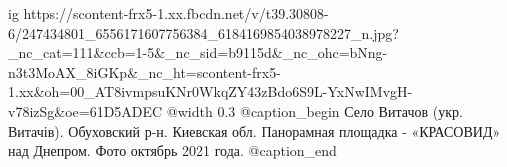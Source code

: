 
 
 
 
 

\ifcmt
  ig https://scontent-frx5-1.xx.fbcdn.net/v/t39.30808-6/247434801_6556171607756384_6184169854038978227_n.jpg?_nc_cat=111&ccb=1-5&_nc_sid=b9115d&_nc_ohc=bNng-n3t3MoAX_8iGKp&_nc_ht=scontent-frx5-1.xx&oh=00_AT8ivmpsuKNr0WkqZY43zBdo6S9L-YxNwIMvgH-v78izSg&oe=61D5ADEC
  @width 0.3
  @caption_begin
    Село Витачов (укр. Витачів). Обуховский р-н. Киевская обл. 
    Панорамная площадка - «КРАСОВИД» над Днепром. Фото октябрь 2021 года.
  @caption_end
\fi
